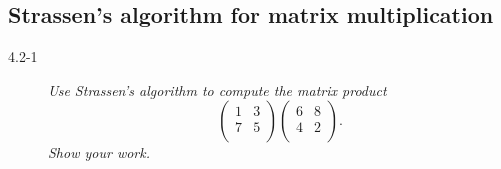 \subsection{Strassen’s algorithm for matrix multiplication}

\begin{description}
  \item[4.2-1] {\itshape Use Strassen’s algorithm to compute the matrix product $$\begin{pmatrix}
      1 & 3\\
      7 & 5\\
    \end{pmatrix}
    \begin{pmatrix}
      6 & 8\\
      4 & 2\\
    \end{pmatrix}.$$ 
  Show your work.}


\end{description}
